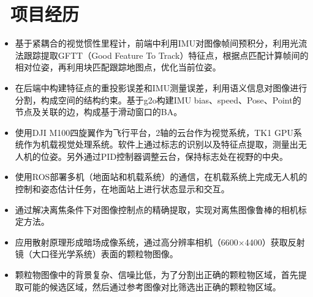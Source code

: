 \documentclass{resume}
\begin{document}
\section{\faUsers\ 项目经历}
\begin{itemize}\small
  \item 基于紧耦合的视觉惯性里程计，前端中利用IMU对图像帧间预积分，利用光流法跟踪提取GFTT（Good Feature To Track）特征点，根据点匹配计算帧间的相对位姿，再利用块匹配跟踪地图点，优化当前位姿。
  \item 在后端中构建特征点的重投影误差和IMU测量误差，利用语义信息对图像进行分割，构成空间的结构约束。基于g2o构建IMU bias、speed、Pose、Point的节点及关联的边，构成基于滑动窗口的BA。
\end{itemize}

\begin{itemize}\small
  \item 使用DJI M100四旋翼作为飞行平台，2轴的云台作为视觉系统，TK1 GPU系统作为机载视觉处理系统。软件上通过标志的识别以及特征点提取，测量出无人机的位姿。另外通过PID控制器调整云台，保持标志处在视野的中央。
  \item 使用ROS部署多机（地面站和机载系统）的通信，在机载系统上完成无人机的控制和姿态估计任务，在地面站上进行状态显示和交互。
  \item 通过解决离焦条件下对图像控制点的精确提取，实现对离焦图像鲁棒的相机标定方法。
\end{itemize}

\begin{itemize}\small
\item 应用散射原理形成暗场成像系统，通过高分辨率相机（6600$\times$4400）获取反射镜（大口径光学系统）表面的颗粒物图像。
\item 颗粒物图像中的背景复杂、信噪比低，为了分割出正确的颗粒物区域，首先提取可能的候选区域，然后通过参考图像对比筛选出正确的颗粒物区域。
\end{itemize}
\end{document}

